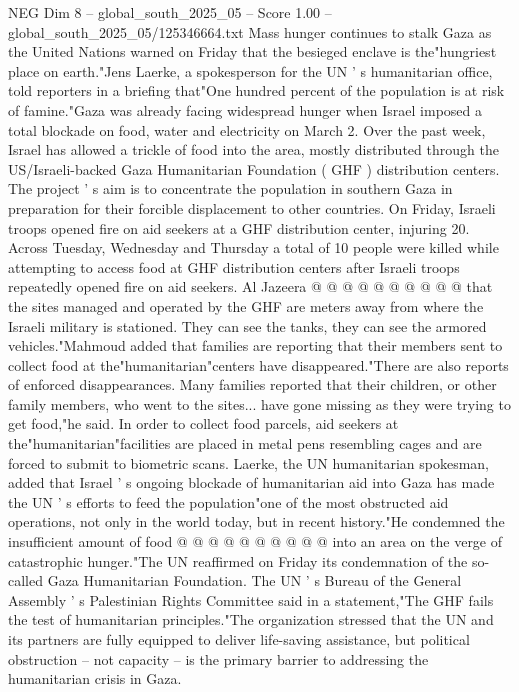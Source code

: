 \begin{textsample}{NEG Dim 8 – global\_south\_2025\_05 – Score 1.00 – global\_south\_2025\_05/125346664.txt}  \label{ex:f8_neg_315}
Mass hunger continues to stalk Gaza as the United Nations warned on Friday that the besieged enclave is the"hungriest place on earth."Jens Laerke, a spokesperson for the UN ' s humanitarian office, told reporters in a briefing that"One hundred percent of the population is at risk of famine."Gaza was already facing widespread hunger when Israel imposed a total blockade on food, water and electricity on March 2.
Over the past week, Israel has allowed a trickle of food into the area, mostly distributed through the US/Israeli-backed Gaza Humanitarian Foundation ( GHF ) distribution centers.
The project ' s aim is to concentrate the population in southern Gaza in preparation for their forcible displacement to other countries.
On Friday, Israeli troops opened fire on aid seekers at a GHF distribution center, injuring 20.
Across Tuesday, Wednesday and Thursday a total of 10 people were killed while attempting to access food at GHF distribution centers after Israeli troops repeatedly opened fire on aid seekers.
Al Jazeera @ @ @ @ @ @ @ @ @ @ that the sites managed and operated by the GHF are meters away from where the Israeli military is stationed.
They can see the tanks, they can see the armored vehicles."Mahmoud added that families are reporting that their members sent to collect food at the"humanitarian"centers have disappeared."There are also reports of enforced disappearances.
Many families reported that their children, or other family members, who went to the sites... have gone missing as they were trying to get food,"he said.
In order to collect food parcels, aid seekers at the"humanitarian"facilities are placed in metal pens resembling cages and are forced to submit to biometric scans.
Laerke, the UN humanitarian spokesman, added that Israel ' s ongoing blockade of humanitarian aid into Gaza has made the UN ' s efforts to feed the population"one of the most obstructed aid operations, not only in the world today, but in recent history."He condemned the insufficient amount of food @ @ @ @ @ @ @ @ @ @ into an area on the verge of catastrophic hunger."The UN reaffirmed on Friday its condemnation of the so-called Gaza Humanitarian Foundation.
The UN ' s Bureau of the General Assembly ' s Palestinian Rights Committee said in a statement,"The GHF fails the test of humanitarian principles."The organization stressed that the UN and its partners are fully equipped to deliver life-saving assistance, but political obstruction -- not capacity -- is the primary barrier to addressing the humanitarian crisis in Gaza.

\end{textsample}
